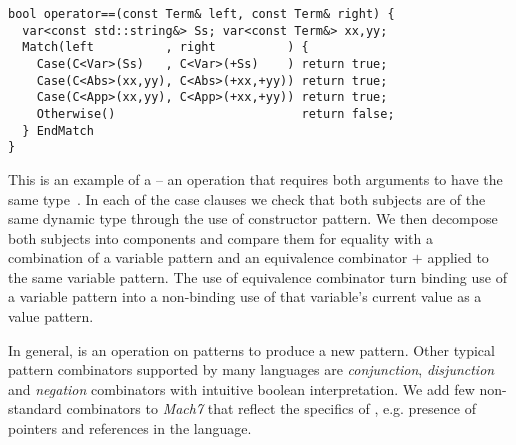 \begin{lstlisting}[columns=flexible]
bool operator==(const Term& left, const Term& right) {
  var<const std::string&> Ss; var<const Term&> xx,yy;
  Match(left          , right          ) {
    Case(C<Var>(Ss)   , C<Var>(+Ss)    ) return true;
    Case(C<Abs>(xx,yy), C<Abs>(+xx,+yy)) return true;
    Case(C<App>(xx,yy), C<App>(+xx,+yy)) return true;
    Otherwise()                          return false;
  } EndMatch
}
\end{lstlisting}

\noindent
This \code{==} is an example of a  -- an operation that 
requires both arguments to have the same type~\cite{BCCLP95}. In each of the 
case clauses we check that both subjects are of the same dynamic type through 
the use of constructor pattern. We then decompose both subjects into 
components and compare them for equality with a combination of a variable pattern 
and an equivalence combinator $+$ applied to the same variable pattern. The use 
of equivalence combinator turn binding use of a variable pattern into a 
non-binding use of that variable's current value as a value pattern.

In general,  is an operation on patterns to produce a 
new pattern. Other typical pattern combinators supported by many languages are
\emph{conjunction}, \emph{disjunction} and \emph{negation} combinators with 
intuitive boolean interpretation. We add few non-standard combinators to 
\emph{Mach7} that reflect the specifics of \Cpp{}, e.g. presence of pointers and 
references in the language.

